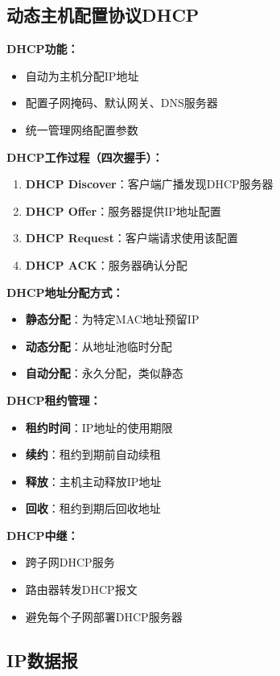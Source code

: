 \documentclass[lang=cn,newtx,10pt,scheme=chinese]{../../elegantbook}
\begin{document}
\subsection{动态主机配置协议DHCP}

\textbf{DHCP功能：}
\begin{itemize}
  \item 自动为主机分配IP地址
  \item 配置子网掩码、默认网关、DNS服务器
  \item 统一管理网络配置参数
\end{itemize}

\textbf{DHCP工作过程（四次握手）：}
\begin{enumerate}
  \item \textbf{DHCP Discover}：客户端广播发现DHCP服务器
  \item \textbf{DHCP Offer}：服务器提供IP地址配置
  \item \textbf{DHCP Request}：客户端请求使用该配置
  \item \textbf{DHCP ACK}：服务器确认分配
\end{enumerate}

\textbf{DHCP地址分配方式：}
\begin{itemize}
  \item \textbf{静态分配}：为特定MAC地址预留IP
  \item \textbf{动态分配}：从地址池临时分配
  \item \textbf{自动分配}：永久分配，类似静态
\end{itemize}

\textbf{DHCP租约管理：}
\begin{itemize}
  \item \textbf{租约时间}：IP地址的使用期限
  \item \textbf{续约}：租约到期前自动续租
  \item \textbf{释放}：主机主动释放IP地址
  \item \textbf{回收}：租约到期后回收地址
\end{itemize}

\textbf{DHCP中继：}
\begin{itemize}
  \item 跨子网DHCP服务
  \item 路由器转发DHCP报文
  \item 避免每个子网部署DHCP服务器
\end{itemize}

\subsection{IP数据报}
\end{document}

